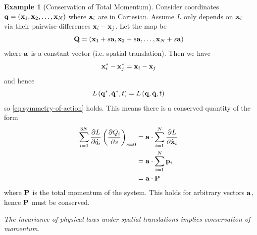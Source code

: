 \documentclass[11pt]{article}
\numberwithin{equation}{section}
\theoremstyle{definition}
\newtheorem{example}[theorem]{Example}
\theoremstyle{remark}
\newcommand{\pqty}[1]{\left(#1\right)}
\newcommand{\vdot}{\cdot}
\begin{document}
\begin{example}[Conservation of Total Momentum]\label{variation-unit-0077}
    Consider coordinates \(\vb{q} = \pqty{\vb{x}_1, \vb{x}_2, \ldots, \vb{x}_N}\) where \(\vb{x}_i\) are in Cartesian. Assume \(L\) only depends on \(\vb{x}_i\) via their pairwise differences \(\vb{x}_i - \vb{x}_j\). Let the map be
    \[
        \vb{Q} = \pqty{\vb{x}_1 + s \vb{a}, \vb{x}_2 + s \vb{a}, \ldots, \vb{x}_N + s \vb{a}}
    \]
    where \(\vb{a}\) is a constant vector (i.e. spatial translation). Then we have
    \[
        \vb{x}^{\ast}_i - \vb{x}^{\ast}_j = \vb{x}_i - \vb{x}_j
    \]
    and hence
    \[
        L \pqty{\vb{q}^{\ast}, \dot{\vb{q}}^{\ast}, t} = L \pqty{\vb{q}, \dot{\vb{q}}, t}
    \]
    so \autoref{eq:symmetry-of-action} holds. This means there is a conserved quantity of the form
    \begin{align*}
        \sum_{i = 1}^{3N} \pdv{L}{\dot{q}_i} \pqty{\pdv{Q_i}{s}}_{s = 0} &= \vb{a} \vdot \sum_{i = 1}^{N} \pdv{L}{\dot{\vb{x}}_i} \\
        &= \vb{a} \vdot \sum_{i = 1}^{N} \vb{p}_i \\
        &= \vb{a} \vdot \vb{P}
    \end{align*}
    where \(\vb{P}\) is the total momentum of the system. This holds for arbitrary vectors \(\vb{a}\), hence \(\vb{P}\) must be conserved.

    \textit{The invariance of physical laws under spatial translations implies conservation of momentum.}
\end{example}
\end{document}
